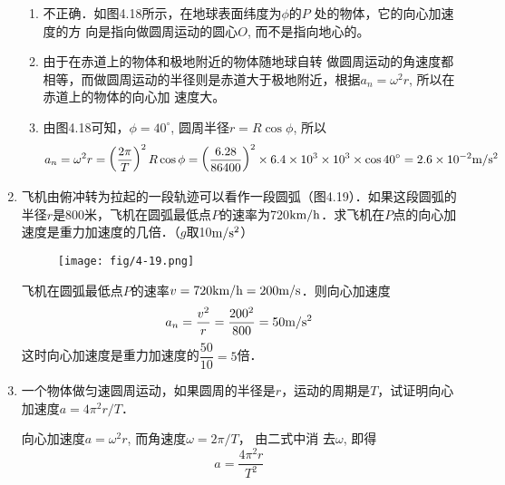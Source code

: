 \begin{enumerate}
\begin{solution}
\begin{enumerate}
    \item 不正确．如图4.18所示，在地球表面纬度为$\phi$的$P$
    处的物体，它的向心加速度的方
    向是指向做圆周运动的圆心$O$,
    而不是指向地心的。
    \item 由于在赤道上的物体和极地附近的物体随地球自转
    做圆周运动的角速度都相等，而做圆周运动的半径则是赤道大于极地附近，根据$a_n=\omega^2 r$, 所以在赤道上的物体的向心加
    速度大。
    \item 由图4.18可知，$\phi=40^{\circ}$, 圆周半径$r=R\cos\phi$, 所以
\[a_n=\omega^2r=\left(\frac{2\pi}{T}\right)^2R\cos\phi=\left(\frac{6.28}{86400}\right)^2\times6.4\times10^3\times10^3\times
    \cos40^{\circ}=2.6\times10^{-2}\text{m}/\text{s}^2\]
\end{enumerate}
\end{solution}
\item	 飞机由俯冲转为拉起的一段轨迹可以看作一段圆弧（图4.19）．如果这段圆弧的半径$r$是800米，飞机在圆弧最低点$P$的速率为720$\text{km}/\text{h}$．求飞机在$P$点的向心加速度是重力加速度的几倍．（$g$取10$\text{m}/\text{s}^2$）
\begin{figure}[htp]
\centering
\texttt{[image: fig/4-19.png]}
\caption{}
\end{figure}


\begin{solution}
    飞机在圆弧最低点$P$的速率$v=720\text{km}/\text{h}=200\text{m}/\text{s}$．则向心加速度
   \[a_n=\frac{v^2}{r}=\frac{200^2}{800}=50\text{m}/\text{s}^2\]
   这时向心加速度是重力加速度的$\dfrac{50}{10}=5$倍．
\end{solution}
	\item 一个物体做匀速圆周运动，如果圆周的半径是$r$，运动的周期是$T$，试证明向心加速度$a=4\pi^2r/T$．

    \begin{solution}
        向心加速度$a=\omega^2 r$, 而角速度$\omega=2\pi/T$，
        由二式中消
        去$\omega$, 即得
        \[a=\frac{4\pi^2r}{T^2}\]
    \end{solution}
\end{enumerate}



